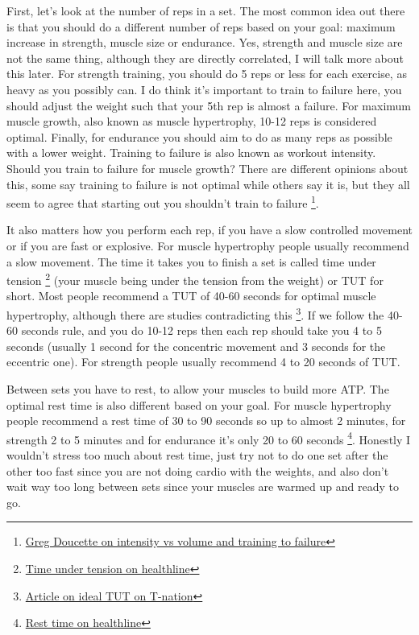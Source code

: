 \documentclass[openany, 12pt]{book}
\begin{document}
        First, let's look at the number of reps in a set. The most common idea out there is that you should do a different number of reps based on your goal: maximum increase in strength, muscle size or
        endurance. Yes, strength and muscle size are not the same thing, although they are directly correlated, I will talk more about this later. For strength training, you should do 5 reps or less
        for each exercise, as heavy as you possibly can. I do think it's important to train to failure here, you should adjust the weight such that your 5th rep is almost a failure.
        For maximum muscle growth, also known as muscle hypertrophy, 10-12 reps is considered optimal. Finally, for endurance you should aim to do as many reps as possible with a lower weight.
        Training to failure is also known as workout intensity. Should you train to failure for muscle growth? There are different opinions about this, some say training to failure is not optimal
        while others say it is, but they all seem to agree that starting out you shouldn't train to failure
        \footnote{\href{https://www.youtube.com/watch?v=39YvjFRiGac}{Greg Doucette on intensity vs volume and training to failure}}.
        
        It also matters how you perform each rep, if you have a slow controlled movement or if you are fast or explosive. For muscle hypertrophy people usually recommend a slow movement.
        The time it takes you to finish a set is called time under tension
        \footnote{\href{https://www.healthline.com/health/exercise-fitness/time-under-tension}{Time under tension on healthline}}
        (your muscle being under the tension from the weight) or TUT for short. Most people recommend a TUT of 40-60 seconds for optimal muscle hypertrophy, although there are studies contradicting this
        \footnote{\href{https://www.t-nation.com/training/the-new-science-of-time-under-tension/}{Article on ideal TUT on T-nation}}. If we follow the 40-60 seconds rule, and you do 10-12 reps then
        each rep should take you 4 to 5 seconds (usually 1 second for the concentric movement and 3 seconds for the eccentric one). For strength people usually recommend 4 to 20 seconds of TUT.

        Between sets you have to rest, to allow your muscles to build more ATP. The optimal rest time is also different based on your goal. For muscle hypertrophy people recommend a rest time of
        30 to 90 seconds so up to almost 2 minutes, for strength 2 to 5 minutes and for endurance it's only 20 to 60 seconds
        \footnote{\href{https://www.healthline.com/health/fitness/rest-between-sets}{Rest time on healthline}}. Honestly I wouldn't stress too much about rest time, just try
        not to do one set after the other too fast since you are not doing cardio with the weights, and also don't wait way too long between sets since your muscles are warmed up and ready to go.
\end{document}
